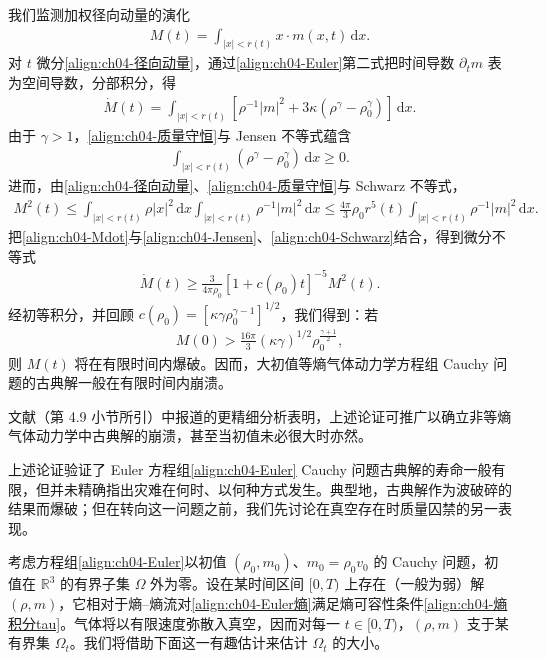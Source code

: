 ﻿\documentclass[../../main.tex]{subfiles}
\begin{document}
我们监测加权径向动量的演化
\begin{align}
M(t)=\int_{|x|<r(t)}x\cdot m(x,t)\,\mathrm{d}x.
\label{align:ch04-径向动量}
\end{align}
对 $t$ 微分\eqref{align:ch04-径向动量}，通过\eqref{align:ch04-Euler}第二式把时间导数 $\partial_{t}m$ 表为空间导数，分部积分，得
\begin{align}
\dot{M}(t)=\int_{|x|<r(t)}\left[\rho^{-1}|m|^{2}+3\kappa(\rho^{\gamma}-\rho_{0}^{\gamma})\right]\,\mathrm{d}x.
\label{align:ch04-Mdot}
\end{align}
由于 $\gamma>1$，\eqref{align:ch04-质量守恒}与 Jensen 不等式蕴含
\begin{align}
\int_{|x|<r(t)}(\rho^{\gamma}-\rho_{0}^{\gamma})\,\mathrm{d}x\geqslant 0.
\label{align:ch04-Jensen}
\end{align}
进而，由\eqref{align:ch04-径向动量}、\eqref{align:ch04-质量守恒}与 Schwarz 不等式，
\begin{align}
M^{2}(t)\leqslant\int_{|x|<r(t)}\rho|x|^{2}\,\mathrm{d}x\int_{|x|<r(t)}\rho^{-1}|m|^{2}\,\mathrm{d}x\leqslant\frac{4\pi}{3}\rho_{0}r^{5}(t)\int_{|x|<r(t)}\rho^{-1}|m|^{2}\,\mathrm{d}x.
\label{align:ch04-Schwarz}
\end{align}
把\eqref{align:ch04-Mdot}与\eqref{align:ch04-Jensen}、\eqref{align:ch04-Schwarz}结合，得到微分不等式
\begin{align}
\dot{M}(t)\geqslant\frac{3}{4\pi\rho_{0}}[1+c(\rho_{0})t]^{-5}M^{2}(t).
\label{align:ch04-M微分}
\end{align}
经初等积分，并回顾 $c(\rho_{0})=[\kappa\gamma\rho_{0}^{\gamma-1}]^{1/2}$，我们得到：若
\begin{align}
M(0)>\frac{16\pi}{3}(\kappa\gamma)^{1/2}\rho_{0}^{\frac{\gamma+1}{2}},
\label{align:ch04-M临界}
\end{align}
则 $M(t)$ 将在有限时间内爆破。因而，大初值等熵气体动力学方程组 Cauchy 问题的古典解一般在有限时间内崩溃。

文献（第 4.9 小节所引）中报道的更精细分析表明，上述论证可推广以确立非等熵气体动力学中古典解的崩溃，甚至当初值未必很大时亦然。

上述论证验证了 Euler 方程组\eqref{align:ch04-Euler} Cauchy 问题古典解的寿命一般有限，但并未精确指出灾难在何时、以何种方式发生。典型地，古典解作为波破碎的结果而爆破；但在转向这一问题之前，我们先讨论在真空存在时质量囚禁的另一表现。

考虑方程组\eqref{align:ch04-Euler}以初值 $(\rho_{0},m_{0})$、$m_{0}=\rho_{0}v_{0}$ 的 Cauchy 问题，初值在 $\mathbb{R}^{3}$ 的有界子集 $\Omega$ 外为零。设在某时间区间 $[0,T)$ 上存在（一般为弱）解 $(\rho,m)$，它相对于熵--熵流对\eqref{align:ch04-Euler熵}满足熵可容性条件\eqref{align:ch04-熵积分tau}。气体将以有限速度弥散入真空，因而对每一 $t\in[0,T)$，$(\rho,m)$ 支于某有界集 $\Omega_{t}$。我们将借助下面这一有趣估计来估计 $\Omega_{t}$ 的大小。
\end{document}
